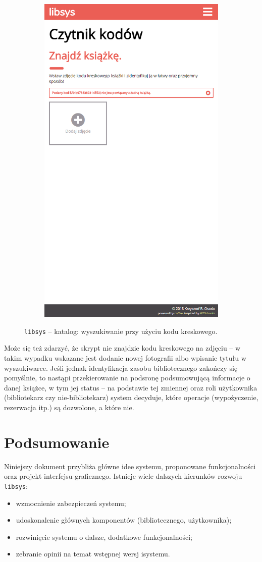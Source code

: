 \documentclass[12pt, a4paper]{article}
\begin{document}
\begin{figure}[h]
\begin{subfigure}{.48\textwidth}
    \includegraphics[width=.75\linewidth]{img/libsys_catalog_4.png}
\end{subfigure}
    \caption{\texttt{libsys} -- katalog: wyszukiwanie przy użyciu kodu kreskowego.}
\end{figure}

Może się też zdarzyć, że skrypt nie znajdzie kodu kreskowego na zdjęciu -- w takim wypadku wskazane jest dodanie nowej fotografii albo wpisanie tytułu w wyszukiwarce. Jeśli jednak identyfikacja zasobu bibliotecznego zakończy się pomyślnie, to nastąpi przekierowanie na podsronę podsumowującą informacje o danej książce, w tym jej status -- na podstawie tej zmiennej oraz roli użytkownika (bibliotekarz czy nie-bibliotekarz) system decyduje, które operacje (wypożyczenie, rezerwacja itp.) są dozwolone, a które nie.

\newpage
\section{Podsumowanie}
Niniejszy dokument przybliża główne idee systemu, proponowane funkcjonalności oraz projekt interfejsu graficznego. Istnieje wiele dalszych kierunków rozwoju \texttt{libsys}:

\begin{itemize}
    \item wzmocnienie zabezpieczeń systemu;
    \item udoskonalenie głównych komponentów (bibliotecznego, użytkownika);
    \item rozwinięcie systemu o dalsze, dodatkowe funkcjonalności;
    \item zebranie opinii na temat wstępnej wersj isystemu.
\end{itemize}
\end{document}
